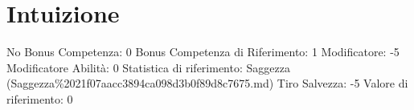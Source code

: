 \section{Intuizione}\label{intuizione}

\begin{description}
\tightlist
\item[Tags: ABI]
No Bonus Competenza: 0 Bonus Competenza di Riferimento: 1 Modificatore:
-5 Modificatore Abilità: 0 Statistica di riferimento: Saggezza
(Saggezza\%2021f07aacc3894ca098d3b0f89d8c7675.md) Tiro Salvezza: -5
Valore di riferimento: 0
\end{description}
